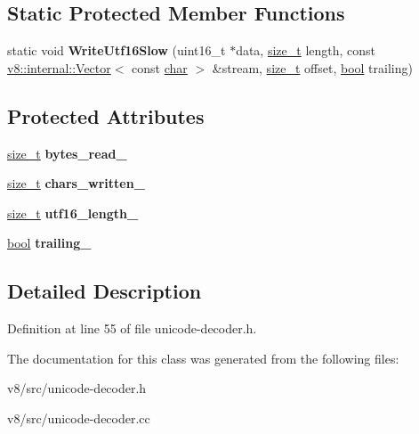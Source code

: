\subsection*{Static Protected Member Functions}
\begin{DoxyCompactItemize}
\item 
\mbox{\label{classunibrow_1_1Utf8DecoderBase_aafeff02480a0f2317576e13b0f579996}} 
static void {\bfseries Write\+Utf16\+Slow} (uint16\+\_\+t $\ast$data, \mbox{\hyperlink{classsize__t}{size\+\_\+t}} length, const \mbox{\hyperlink{classv8_1_1internal_1_1Vector}{v8\+::internal\+::\+Vector}}$<$ const \mbox{\hyperlink{classchar}{char}} $>$ \&stream, \mbox{\hyperlink{classsize__t}{size\+\_\+t}} offset, \mbox{\hyperlink{classbool}{bool}} trailing)
\end{DoxyCompactItemize}
\subsection*{Protected Attributes}
\begin{DoxyCompactItemize}
\item 
\mbox{\label{classunibrow_1_1Utf8DecoderBase_aff07d415d8468b34588055610f2bf5c8}} 
\mbox{\hyperlink{classsize__t}{size\+\_\+t}} {\bfseries bytes\+\_\+read\+\_\+}
\item 
\mbox{\label{classunibrow_1_1Utf8DecoderBase_a03a4ecab435d06721b1f05de64cfa08e}} 
\mbox{\hyperlink{classsize__t}{size\+\_\+t}} {\bfseries chars\+\_\+written\+\_\+}
\item 
\mbox{\label{classunibrow_1_1Utf8DecoderBase_af597f9d62ba438dd113aca3091fa68d2}} 
\mbox{\hyperlink{classsize__t}{size\+\_\+t}} {\bfseries utf16\+\_\+length\+\_\+}
\item 
\mbox{\label{classunibrow_1_1Utf8DecoderBase_aed816a919bab3bd41279176c8623c405}} 
\mbox{\hyperlink{classbool}{bool}} {\bfseries trailing\+\_\+}
\end{DoxyCompactItemize}


\subsection{Detailed Description}


Definition at line 55 of file unicode-\/decoder.\+h.



The documentation for this class was generated from the following files\+:\begin{DoxyCompactItemize}
\item 
v8/src/unicode-\/decoder.\+h\item 
v8/src/unicode-\/decoder.\+cc\end{DoxyCompactItemize}
